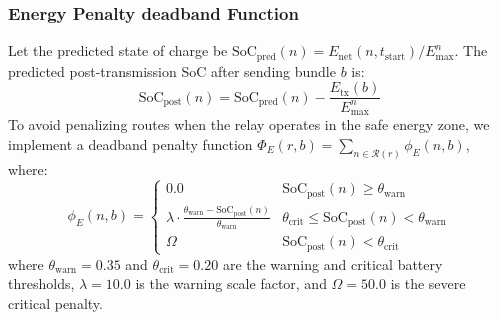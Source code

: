 \documentclass[journal,twocolumn]{IEEEtran}
\begin{document}
\subsubsection{Energy Penalty deadband Function}
Let the predicted state of charge be $\text{SoC}_{\text{pred}}(n) = E_{\text{net}}(n, t_{\text{start}}) / E_{\max}^n$. The predicted post-transmission SoC after sending bundle $b$ is:
\begin{equation}
    \text{SoC}_{\text{post}}(n) = \text{SoC}_{\text{pred}}(n) - \frac{E_{\text{tx}}(b)}{E_{\max}^n}
\end{equation}
To avoid penalizing routes when the relay operates in the safe energy zone, we implement a deadband penalty function $\Phi_E(r, b) = \sum_{n \in \mathcal{R}(r)} \phi_E(n, b)$, where:
\begin{equation}
    \phi_E(n, b) = \begin{cases}
        0.0 & \text{SoC}_{\text{post}}(n) \geq \theta_{\text{warn}} \\
        \lambda \cdot \frac{\theta_{\text{warn}} - \text{SoC}_{\text{post}}(n)}{\theta_{\text{warn}}} & \theta_{\text{crit}} \leq \text{SoC}_{\text{post}}(n) < \theta_{\text{warn}} \\
        \Omega & \text{SoC}_{\text{post}}(n) < \theta_{\text{crit}}
    \end{cases}
\end{equation}
where $\theta_{\text{warn}} = 0.35$ and $\theta_{\text{crit}} = 0.20$ are the warning and critical battery thresholds, $\lambda = 10.0$ is the warning scale factor, and $\Omega = 50.0$ is the severe critical penalty.
\end{document}
